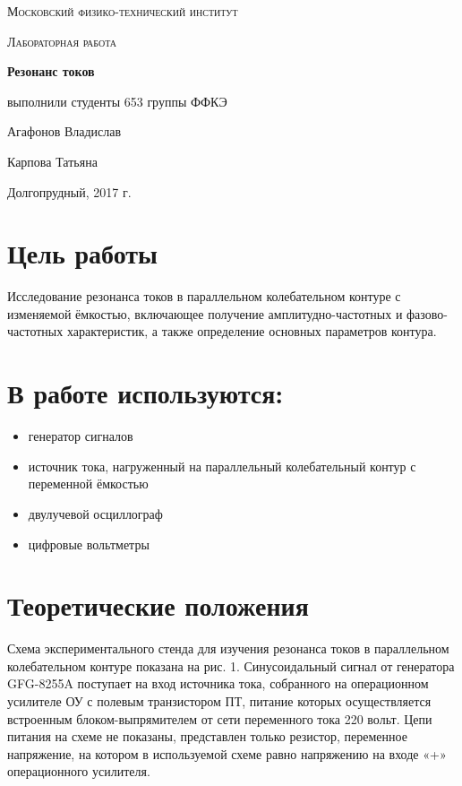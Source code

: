 \documentclass[a4paper]{article}
\begin{document}
\begin{titlepage}
	\centering
	\vspace{5cm}
	{\scshape\LARGE Московский физико-технический институт \par}
	\vspace{4cm}
	{\scshape\Large Лабораторная работа \par}
	\vspace{1cm}
	{\huge\bfseries Резонанс токов \par}
	\vspace{1cm}
	\vfill
\begin{flushright}
	{\large выполнили студенты 653 группы ФФКЭ}\par
	\vspace{0.3cm}
	{\LARGE Агафонов Владислав}
	
	
	{\LARGE Карпова Татьяна}
\end{flushright}
	

	\vfill

	Долгопрудный, 2017 г.
\end{titlepage}

\section{Цель работы}

Исследование резонанса токов в параллельном колебательном контуре с изменяемой ёмкостью, включающее получение амплитудно-частотных и фазово-частотных характеристик, а также определение основных параметров контура.

\section{В работе используются:}
\begin{itemize}
    \item генератор сигналов
    \item источник тока, нагруженный на параллельный колебательный контур с переменной ёмкостью
    \item двулучевой осциллограф
    \item цифровые вольтметры
\end{itemize}


\section{Теоретические положения}

Схема экспериментального стенда для изучения резонанса токов в параллельном колебательном контуре показана на рис. 1. Синусоидальный сигнал от генератора GFG-8255A поступает на вход источника тока, собранного на операционном усилителе ОУ с полевым транзистором ПТ, питание которых осуществляется встроенным блоком-выпрямителем от сети переменного тока 220 вольт. Цепи питания на схеме не показаны, представлен только резистор, переменное напряжение, на котором в используемой схеме равно напряжению на входе «+» операционного усилителя. \\
\end{document}

